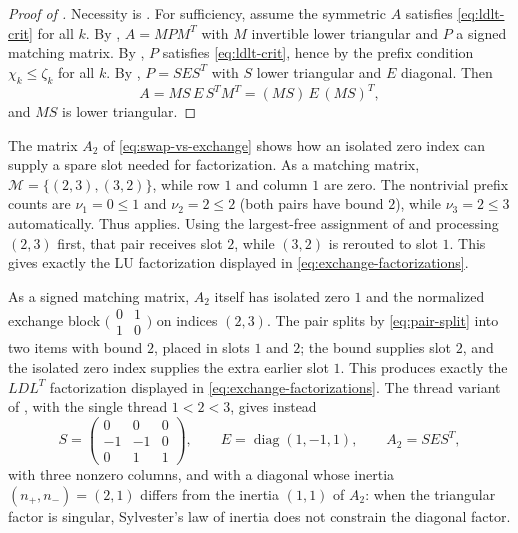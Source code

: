 \documentclass[preprint,12pt]{elsarticle}
\theoremstyle{plain}
\theoremstyle{nonumberplain}
\newtheorem{proof}{Proof}
\numberwithin{equation}{section}
\newcommand{\M}{\mathcal{M}}
\numberwithin{theorem}{section}
\begin{document}
\begin{proof}[Proof of ]
  Necessity is .  For sufficiency, assume the symmetric
  $A$ satisfies \cref{eq:ldlt-crit} for all $k$.  By
  , $A = M P M^T$ with $M$ invertible lower triangular
  and $P$ a signed matching matrix.  By , $P$
  satisfies \cref{eq:ldlt-crit}, hence by  the prefix
  condition $\chi_k \le \zeta_k$ for all $k$.  By
  , $P = S E S^T$ with $S$ lower triangular and $E$
  diagonal.  Then
  \[
    A = M S \, E \, S^T M^T = (MS) \, E \, (MS)^T,
  \]
  and $MS$ is lower triangular.
\end{proof}

\begin{example}\label{ex:exchange}
  The matrix $A_2$ of \cref{eq:swap-vs-exchange} shows how an isolated zero index can supply a spare slot needed for factorization. As a matching matrix, $\M=\{(2,3),(3,2)\}$, while row $1$ and column $1$ are zero. The nontrivial prefix counts are $\nu_1=0\le1$ and $\nu_2=2\le2$ (both pairs have bound $2$), while $\nu_3=2\le3$ automatically. Thus  applies. Using the largest-free assignment of  and processing $(2,3)$ first, that pair receives slot $2$, while $(3,2)$ is rerouted to slot $1$. This gives exactly the LU factorization displayed in \cref{eq:exchange-factorizations}.

  As a signed matching matrix, $A_2$ itself has isolated zero $1$ and the normalized exchange block $\bigl(
    \begin{smallmatrix}0&1\\1&0
  \end{smallmatrix}\bigr)$ on indices $(2,3)$. The pair splits by \cref{eq:pair-split} into two items with bound $2$, placed in slots $1$ and $2$; the bound supplies slot $2$, and the isolated zero index supplies the extra earlier slot $1$. This produces exactly the $LDL^T$ factorization displayed in \cref{eq:exchange-factorizations}. The thread variant of , with the single thread $1<2<3$, gives instead
  \[
    S=
    \begin{pmatrix}
      0&0&0\\
      -1&-1&0\\
      0&1&1
    \end{pmatrix},
    \qquad
    E=\operatorname{diag}(1,-1,1),
    \qquad
    A_2=SES^T,
  \]
  with three nonzero columns, and with a diagonal whose inertia
  $(n_+, n_-) = (2,1)$ differs from the inertia $(1,1)$ of $A_2$: when the
  triangular factor is singular, Sylvester's law of inertia does not
  constrain the diagonal factor.
\end{example}
\end{document}
